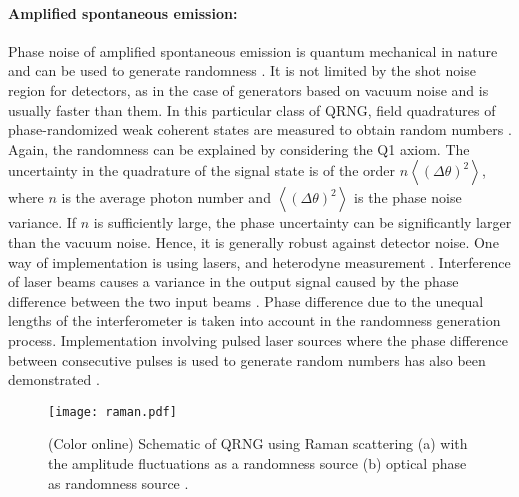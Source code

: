 \documentclass[]{interact}
\theoremstyle{plain}%
\theoremstyle{definition}
\theoremstyle{remark}
\begin{document}
\paragraph{Amplified spontaneous emission:} Phase noise of amplified
spontaneous emission is quantum mechanical in nature and can be used to generate randomness \cite{Li_2011}. It is not limited by the shot noise region for detectors, as in the case of generators based on vacuum noise and is usually faster than them. In this particular class of QRNG, field quadratures of phase-randomized weak coherent states are measured to obtain random numbers \cite{Nie_2015}. Again, the randomness can be explained by considering the Q1 axiom. The uncertainty in the quadrature of the signal state is of the order $n\left\langle(\Delta \theta)^{2}\right\rangle$, where $n$ is the average photon number and $\left\langle(\Delta \theta)^{2}\right\rangle$ is the phase noise variance. If $n$ is sufficiently large, the phase uncertainty can be significantly larger than the vacuum noise. Hence, it is generally robust against detector noise. One way of implementation is using lasers, and heterodyne measurement \cite{Shakhovoy:20}. Interference of laser beams causes a variance in the output signal caused by the phase difference between the two input beams \cite{Qi:10}. Phase difference due to the unequal lengths of the interferometer is taken into account in the randomness generation process. Implementation involving pulsed laser sources where the phase difference between consecutive pulses is used to generate random numbers has also been demonstrated \cite{Jofre:11,Abellan:14}. 
\begin{figure}
    \centering
    \texttt{[image: raman.pdf]}
    \caption{ (Color online) Schematic of QRNG using Raman scattering (a) with the amplitude fluctuations as a randomness source \cite{bustard2013quantum} (b) optical phase as randomness source \cite{bustard2011quantum}. }
    \label{fig:raman}
\end{figure}
\end{document}

